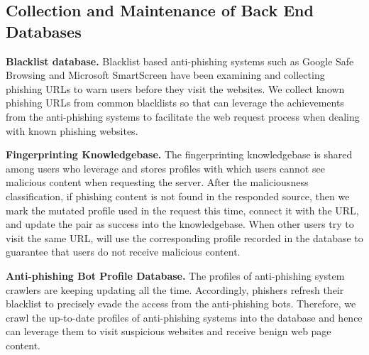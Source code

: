 \subsection{Collection and Maintenance of Back End Databases}

\noindent
\textbf{Blacklist database.}
Blacklist based anti-phishing systems such as Google Safe Browsing and Microsoft SmartScreen have been examining and collecting phishing URLs to warn users before they visit the websites.
We collect known phishing URLs from common blacklists so that \spartacus can leverage the achievements from the anti-phishing systems to facilitate the web request process when dealing with known phishing websites.

\noindent
\textbf{Fingerprinting Knowledgebase.}
The fingerprinting knowledgebase is shared among users who leverage \spartacus and stores profiles with which users cannot see malicious content when requesting the server.
After the maliciousness classification, if phishing content is not found in the responded source, then we mark the mutated profile used in the request this time, connect it with the URL, and update the pair as success into the knowledgebase.
When other users try to visit the same URL, \spartacus will use the corresponding profile recorded in the database to guarantee that users do not receive malicious content.

\noindent
\textbf{Anti-phishing Bot Profile Database.}
The profiles of anti-phishing system crawlers are keeping updating all the time.
Accordingly, phishers refresh their blacklist to precisely evade the access from the anti-phishing bots.
Therefore, we crawl the up-to-date profiles of anti-phishing systems into the database and hence \spartacus can leverage them to visit suspicious websites and receive benign web page content.




